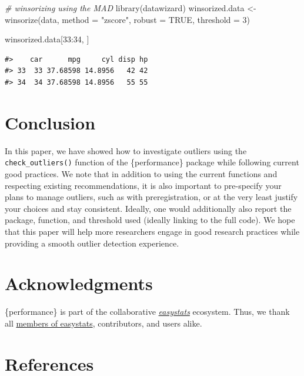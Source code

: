 \documentclass[
]{article}
\newenvironment{Shaded}{\begin{snugshade}}{\end{snugshade}}
\newcommand{\AttributeTok}[1]{\textcolor[rgb]{0.77,0.63,0.00}{#1}}
\newcommand{\CommentTok}[1]{\textcolor[rgb]{0.56,0.35,0.01}{\textit{#1}}}
\newcommand{\ConstantTok}[1]{\textcolor[rgb]{0.00,0.00,0.00}{#1}}
\newcommand{\DecValTok}[1]{\textcolor[rgb]{0.00,0.00,0.81}{#1}}
\newcommand{\FunctionTok}[1]{\textcolor[rgb]{0.00,0.00,0.00}{#1}}
\newcommand{\NormalTok}[1]{#1}
\newcommand{\OtherTok}[1]{\textcolor[rgb]{0.56,0.35,0.01}{#1}}
\newcommand{\SpecialCharTok}[1]{\textcolor[rgb]{0.00,0.00,0.00}{#1}}
\newcommand{\StringTok}[1]{\textcolor[rgb]{0.31,0.60,0.02}{#1}}
\begin{document}
\begin{Shaded}
\begin{Highlighting}[]
\CommentTok{\# winsorizing using the MAD}
\FunctionTok{library}\NormalTok{(datawizard)}
\NormalTok{winsorized.data }\OtherTok{\textless{}{-}} \FunctionTok{winsorize}\NormalTok{(data, }\AttributeTok{method =} \StringTok{"zscore"}\NormalTok{, }\AttributeTok{robust =} \ConstantTok{TRUE}\NormalTok{, }\AttributeTok{threshold =} \DecValTok{3}\NormalTok{)}

\NormalTok{winsorized.data[}\DecValTok{33}\SpecialCharTok{:}\DecValTok{34}\NormalTok{, ]}
\end{Highlighting}
\end{Shaded}

\begin{verbatim}
#>    car      mpg     cyl disp hp
#> 33  33 37.68598 14.8956   42 42
#> 34  34 37.68598 14.8956   55 55
\end{verbatim}

\hypertarget{conclusion}{%
\section{Conclusion}\label{conclusion}}

In this paper, we have showed how to investigate outliers using the \texttt{check\_outliers()} function of the \{performance\} package while following current good practices. We note that in addition to using the current functions and respecting existing recommendations, it is also important to pre-specify your plans to manage outliers, such as with preregistration, or at the very least justify your choices and stay consistent. Ideally, one would additionally also report the package, function, and threshold used (ideally linking to the full code). We hope that this paper will help more researchers engage in good research practices while providing a smooth outlier detection experience.

\hypertarget{acknowledgments}{%
\section{Acknowledgments}\label{acknowledgments}}

\{performance\} is part of the collaborative \href{https://github.com/easystats/easystats}{\emph{easystats}} ecosystem. Thus, we thank all \href{https://github.com/orgs/easystats/people}{members of easystats}, contributors, and users alike.

\hypertarget{references}{%
\section*{References}\label{references}}
\end{document}
